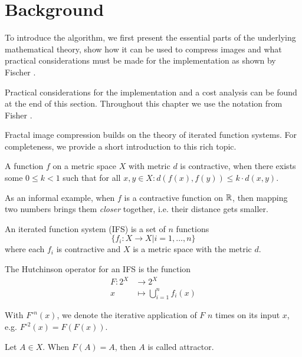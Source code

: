 \section{Background}\label{sec:background}

To introduce the algorithm, we first present the essential parts of the
underlying mathematical theory, show how it can be used to compress images and
what practical considerations must be made for the implementation as shown by
Fischer \cite{fisher2012}.

Practical considerations for the implementation and a cost analysis can be found
at the end of this section. Throughout this chapter we use the notation from
Fisher \cite{fisher2012}.

 Fractal image compression builds on the
theory of iterated function systems. For completeness, we provide a short
introduction to this rich topic.

\begin{definition}
    A function $f$ on a metric space $X$ with metric $d$ is contractive, when there exists some $0 \leq k < 1$
    such that for all $x,y \in X: d(f(x), f(y)) \leq k \cdot d(x,y)$.
\end{definition}

As an informal example, when $f$ is a contractive function on $\mathbb{R}$, then mapping
two numbers brings them \textit{closer} together, i.e. their distance gets
smaller.

\begin{definition}
    An iterated function system (IFS) is a set of $n$ functions $$\{f_i:X \to X | i=1,...,n\}$$
    where each $f_i$ is contractive and $X$ is a metric space with the metric $d$.
\end{definition}

\begin{definition}
    The Hutchinson operator for an IFS is the function
    \begin{align*}
        F \colon 2^X &\to 2^X\\
        x &\mapsto \bigcup_{i=1}^n f_i(x)
    \end{align*}
\end{definition}

With $F^{\circ n}(x)$, we denote the iterative application of $F$ $n$ times on
its input $x$, e.g. $F^{\circ 2}(x) = F(F(x))$.

\begin{definition}
    Let $A \in X$. When $F(A)=A$, then $A$ is called attractor.
\end{definition}

